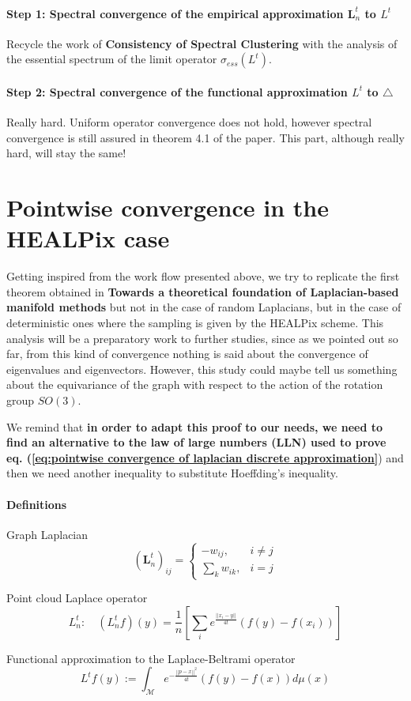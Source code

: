 \paragraph{Step 1: Spectral convergence of the empirical approximation $\mathbf{ L}_n^t$ to $L^t$}
Recycle the work of \textbf{Consistency of Spectral Clustering} with the analysis of the essential spectrum of the limit operator $\sigma_{ess}(L^t)$.
\paragraph{Step 2: Spectral convergence of the functional approximation $L^t$ to $\triangle$}
Really hard. Uniform operator convergence does not hold, however spectral convergence is still assured in theorem 4.1 of the paper. This part, although really hard, will stay the same!


\section{Pointwise convergence in the HEALPix case}

Getting inspired from the work flow presented above, we try to replicate the first theorem obtained in \textbf{Towards a theoretical foundation of Laplacian-based manifold methods} but not in the case of random Laplacians, but in the case of deterministic ones where the sampling is given by the HEALPix scheme. This analysis will be a preparatory work to further studies, since as we pointed out so far, from this kind of convergence nothing is said about the convergence of eigenvalues and eigenvectors. However, this study could maybe tell us something about the equivariance of the graph with respect to the action of the rotation group $SO(3)$.


We remind that \textbf{in order to adapt this proof to our needs, we need to find an alternative to the law of large numbers (LLN) used to prove eq. (\ref{eq:pointwise convergence of laplacian discrete approximation}}) and then we need another inequality to substitute Hoeffding's inequality. 


\paragraph{Definitions}

\begin{definition}{Graph Laplacian}
	$$ \left(\mathbf L_n^t\right)_{ij}=\begin{cases}
	-w_{ij}, & i\neq j\\
	\sum_{k}w_{ik}, & i=j
	\end{cases}$$
\end{definition}
\begin{definition}{Point cloud Laplace operator}
	$$L_n^t:\quad(L_n^tf)(y) = \frac{1}{n}\left[ \sum_i e^\frac{||x_i-y||}{4t}\left(f(y)-f(x_i)\right)\right]$$
\end{definition}
\begin{definition}{Functional approximation to the Laplace-Beltrami operator} \label{eq: my L^t}
	$$L^tf(y) := \int_\mathcal Me^{-\frac{||p-x||^2}{4t}}\left(f(y)-f(x)\right)d\mu(x)$$
\end{definition}

